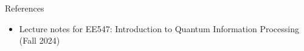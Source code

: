 \documentclass[9pt]{beamer}
\begin{document}
    \begin{frame}{References}
        
        \begin{itemize}
            \item Lecture notes for EE547: Introduction to Quantum Information Processing (Fall 2024)
        \end{itemize}
        \vspace{6cm}
    \end{frame}
\end{document}
